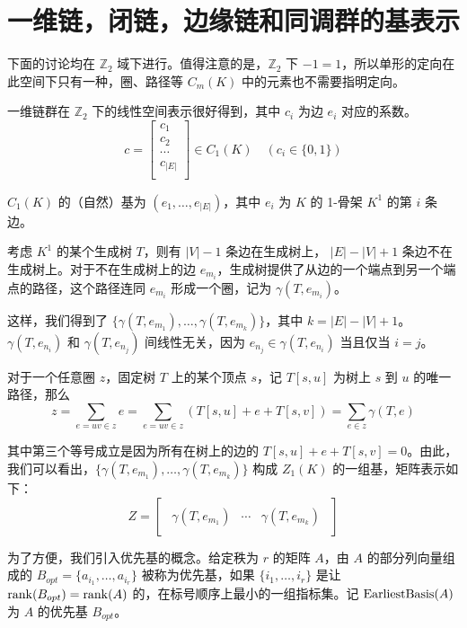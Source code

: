 \section{一维链，闭链，边缘链和同调群的基表示}

下面的讨论均在 $ \mathbb{Z}_2 $ 域下进行。值得注意的是，$ \mathbb{Z}_2 $ 下 $ -1 = 1 $，所以单形的定向在此空间下只有一种，圈、路径等 $ C_m(K) $ 中的元素也不需要指明定向。

一维链群在 $ \mathbb{Z}_2 $ 下的线性空间表示很好得到，其中 $ c_i $ 为边 $ e_i $ 对应的系数。
$$
c = \begin{bmatrix}
        c_1 \\
        c_2 \\
        \cdots \\
        c_{|E|} \\
    \end{bmatrix} \in C_1(K) \quad (c_i \in \{0, 1\})
$$

$ C_1(K) $ 的（自然）基为 $ (e_1, \dots, e_{|E|}) $，其中 $ e_i $ 为 $ K $ 的 1-骨架 $ K^1 $ 的第 $ i $ 条边。

考虑 $ K^1 $ 的某个生成树 $ T $，则有 $ |V| - 1 $ 条边在生成树上， $ |E| - |V| + 1 $ 条边不在生成树上。对于不在生成树上的边 $ e_{m_i} $，生成树提供了从边的一个端点到另一个端点的路径，这个路径连同 $ e_{m_i} $ 形成一个圈，记为 $ \gamma(T, e_{m_i}) $。

这样，我们得到了 $ \{ \gamma(T, e_{m_1}), \dots, \gamma(T, e_{m_{k}}) \} $，其中 $ k = |E| - |V| + 1 $。$ \gamma(T, e_{n_i}) $ 和 $ \gamma(T, e_{n_j}) $ 间线性无关，因为 $ e_{n_j} \in \gamma(T, e_{n_i}) $ 当且仅当 $ i = j $。

对于一个任意圈 $ z $，固定树 $ T $ 上的某个顶点 $ s $，记 $ T[s, u] $ 为树上 $ s $ 到 $ u $ 的唯一路径，那么
$$
z = \sum_{e=uv \in z} e = \sum_{e=uv \in z} (T[s, u] + e + T[s, v]) = \sum_{e \in z} \gamma(T, e)
$$

其中第三个等号成立是因为所有在树上的边的 $ T[s, u] + e + T[s, v] = 0 $。由此，我们可以看出，$ \{ \gamma(T, e_{m_1}), \dots, \gamma(T, e_{m_{k}}) \} $ 构成 $ Z_1(K) $ 的一组基，矩阵表示如下：
$$
Z = 
\begin{bmatrix}
\begin{array}{c|c|c}
    \gamma(T, e_{m_1}) & \cdots & \gamma(T, e_{m_{k}})
\end{array}
\end{bmatrix}
$$

为了方便，我们引入优先基的概念。给定秩为 $ r $ 的矩阵 $ A $，由 $ A $ 的部分列向量组成的 $ B_{opt} = \{a_{i_1}, \dots, a_{i_r}\} $ 被称为优先基，如果 $ \{ i_1, \dots, i_r \} $ 是让 $ {\rm rank}(B_{opt}) = {\rm rank}(A) $ 的，在标号顺序上最小的一组指标集。记 $ {\rm EarliestBasis}(A) $ 为 $ A $ 的优先基 $ B_{opt} $。

